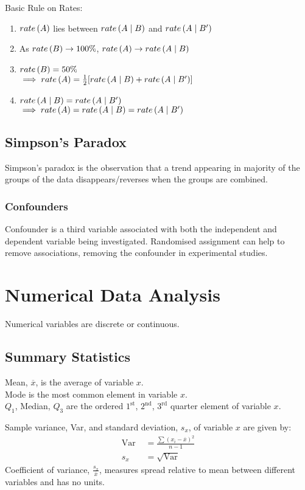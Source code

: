 \documentclass[12pt, a4paper]{article}
\begin{document}
\begin{multicols*}{3}
Basic Rule on Rates:
\begin{enumerate}[\roman*.]
  \item $\mathord{rate} \left( A \right)$ lies between $\mathord{rate} \left( A\mid B \right)$ and $\mathord{rate} \left( A\mid B' \right)$
  \item As $\mathord{rate} \left( B \right) \rightarrow 100\%$, $\mathord{rate} \left( A \right) \rightarrow \mathord{rate} \left( A\mid B \right)$
  \item $\mathord{rate} \left( B \right) = 50\%$ \\$\implies \mathord{rate} \left( A \right) = \frac{1}{2}[\mathord{rate} \left( A\mid B \right) + \mathord{rate} \left( A\mid B' \right)]$
  \item $\mathord{rate} \left( A\mid B \right) = \mathord{rate} \left( A\mid B' \right)$\\$\implies \mathord{rate} \left( A \right) = \mathord{rate} \left( A\mid B \right) = \mathord{rate} \left( A\mid B' \right)$
\end{enumerate}

\subsection{Simpson's Paradox}
Simpson's paradox is the observation that a trend appearing in majority of the groups of the data disappears/reverses when the groups are combined.

\subsubsection{Confounders}
Confounder is a third variable associated with both the independent and dependent variable being investigated. Randomised assignment can help to remove associations, removing the confounder in experimental studies.
\colbreak
\section{Numerical Data Analysis}
Numerical variables are discrete or continuous.

\subsection{Summary Statistics}
Mean, $\overline{x}$, is the average of variable $x$.\\
Mode is the most common element in variable $x$.\\
$Q_1$, Median, $Q_3$ are the ordered  $1^{\text{st}}$, $2^{\text{nd}}$, $3^{\text{rd}}$ quarter element of variable $x$.

Sample variance, Var, and standard deviation, $s_x$, of variable $x$ are given by: 
\begin{align*}
  \text{Var }&= \frac{\sum (x_i-\overline{x})^2}{n-1}\\
  s_x &= \sqrt{\text{Var}}
\end{align*}
Coefficient of variance, $\displaystyle \frac{s_x}{\overline{x}}$, measures spread relative to mean between different variables and has no units.


\end{multicols*}
\end{document}
